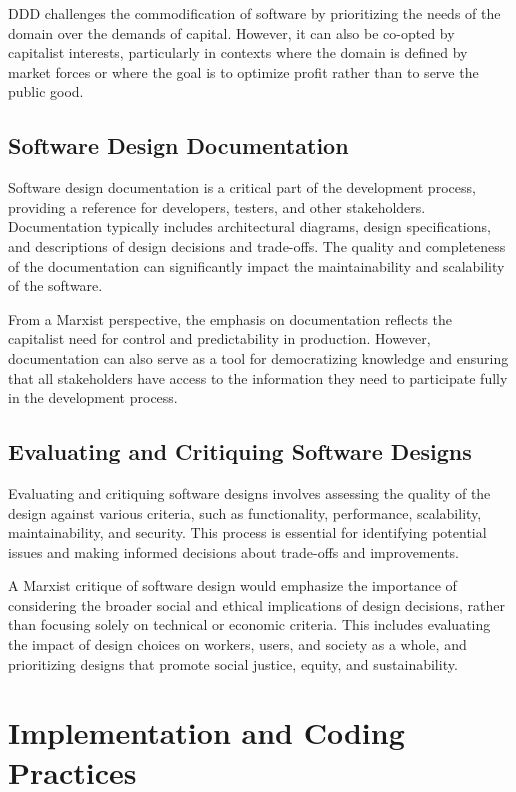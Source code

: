 \begin{refsection}
\begin{multicols}{2}
{DDD challenges the commodification of software by prioritizing the needs of the domain over the demands of capital. However, it can also be co-opted by capitalist interests, particularly in contexts where the domain is defined by market forces or where the goal is to optimize profit rather than to serve the public good.

\subsection{Software Design Documentation}

Software design documentation is a critical part of the development process, providing a reference for developers, testers, and other stakeholders. Documentation typically includes architectural diagrams, design specifications, and descriptions of design decisions and trade-offs. The quality and completeness of the documentation can significantly impact the maintainability and scalability of the software.

From a Marxist perspective, the emphasis on documentation reflects the capitalist need for control and predictability in production. However, documentation can also serve as a tool for democratizing knowledge and ensuring that all stakeholders have access to the information they need to participate fully in the development process.

\subsection{Evaluating and Critiquing Software Designs}

Evaluating and critiquing software designs involves assessing the quality of the design against various criteria, such as functionality, performance, scalability, maintainability, and security. This process is essential for identifying potential issues and making informed decisions about trade-offs and improvements.

A Marxist critique of software design would emphasize the importance of considering the broader social and ethical implications of design decisions, rather than focusing solely on technical or economic criteria. This includes evaluating the impact of design choices on workers, users, and society as a whole, and prioritizing designs that promote social justice, equity, and sustainability.

}
\end{multicols}
\newpage

\section{Implementation and Coding Practices}
\begin{multicols}{2}
{\small

}
\end{multicols}
\end{refsection}
